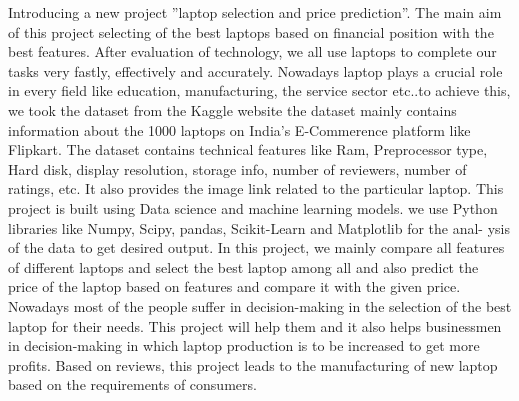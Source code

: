 \hspace{0.5in}
Introducing a new project ”laptop selection and price prediction”. The main aim
of this project selecting of the best laptops based on financial position with the best
features. After evaluation of technology, we all use laptops to complete our tasks
very fastly, effectively and accurately. Nowadays laptop plays a crucial role in every
field like education, manufacturing, the service sector etc..to achieve this, we took the
dataset from the Kaggle website the dataset mainly contains information about the
1000 laptops on India’s E-Commerence platform like Flipkart. The dataset contains
technical features like Ram, Preprocessor type, Hard disk, display resolution, storage
info, number of reviewers, number of ratings, etc. It also provides the image link
related to the particular laptop.
This project is built using Data science and machine learning models. we use
Python libraries like Numpy, Scipy, pandas, Scikit-Learn and Matplotlib for the anal-
ysis of the data to get desired output. In this project, we mainly compare all features
of different laptops and select the best laptop among all and also predict the price of
the laptop based on features and compare it with the given price.
Nowadays most of the people suffer in decision-making in the selection of the best
laptop for their needs. This project will help them and it also helps businessmen in
decision-making in which laptop production is to be increased to get more profits.
Based on reviews, this project leads to the manufacturing of new laptop based on
the requirements of consumers.


 
